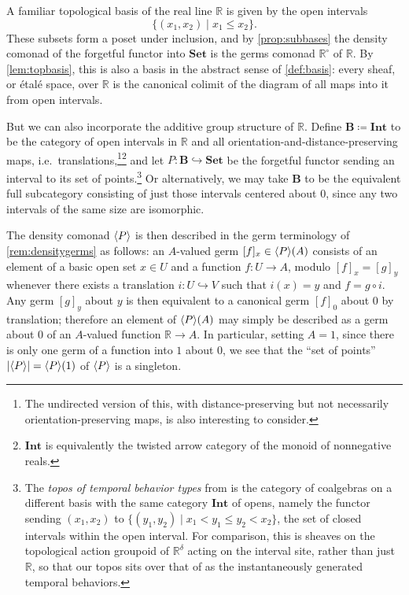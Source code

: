 \documentclass[11pt, oneside, article]{memoir}
\theoremstyle{plain}
\theoremstyle{definition}
\theoremstyle{remark}
\newenvironment{example}
{\renewcommand\qedsymbol{$\lrcorner$}%
  \pushQED{\qed}\myexample}
{\popQED\endmyexample}
\DeclarePairedDelimiter{\gen}{\langle}{\rangle}
\DeclarePairedDelimiter{\abs}{\lvert}{\rvert}
\newcommand{\namedcat}[1]{\mathbf{#1}}
\newcommand{\cat}[1]{\mathbf{#1}}
\newcommand{\Set}{\namedcat{Set}}
\newcommand{\Int}{\namedcat{Int}}
\newcommand{\pts}[1]{{\abs{#1}}}
\newcommand{\ph}[1]{#1}
\newcommand{\setof}[1]{\{#1\}}
\newcommand{\xA}{A}
\newcommand{\bB}{\cat{B}}
\newcommand{\pP}{\ph{P}}
\newcommand{\cP}{\gen{\pP}}
\newcommand{\toptocmd}[1]{{{#1}^\circ}}
\newcommand{\rr}{\mathbb{R}}
\begin{document}
\begin{example}[Infinitesimal group actions]\label{ex:real_line}\label{ex:etendue}\label{ex:topgroup}
  A familiar topological basis of the real line $\rr$ is given by the open
  intervals
  \[
    \setof{(x_1,x_2)\mid x_1 \leq x_2}.
  \]
  These subsets form a poset under inclusion, and by
  \cref{prop:subbases} the density comonad of the forgetful functor
  into $\Set$ is the germs comonad $\toptocmd{\rr}$ of $\rr$. By
  \cref{lem:topbasis}, this is also a basis in the abstract sense of
  \cref{def:basis}: every sheaf, or \'etal\'e space, over $\rr$ is the
  canonical colimit of the diagram of all maps into it from open
  intervals.

  But we can also incorporate the additive group structure of
  $\rr$. Define $\bB \coloneqq \Int$ to be the category of open
  intervals in $\rr$ and all orientation-and-distance-preserving maps,
  i.e.\ translations,\footnote{The undirected version of this, with
    distance-preserving but not necessarily orientation-preserving
    maps, is also interesting to consider.}\footnote{$\Int$ is
    equivalently the twisted arrow category of the monoid of
    nonnegative reals.} and let $\pP \colon \bB \hookrightarrow \Set$
  be the forgetful functor sending an interval to its set of
  points.\footnote{The \emph{topos of temporal behavior types} from
    \cite{schultz-spivak} is the category of coalgebras on a different
    basis with the same category $\Int$ of opens, namely the functor
    sending $(x_1,x_2)$ to
    $\setof{(y_1,y_2)\mid x_1<y_1\leq y_2<x_2}$, the set of closed
    intervals within the open interval. For comparison, this is 
    sheaves on the topological action groupoid of $\mathbb{R}^\delta$ 
    acting on the interval site, rather than just $\mathbb{R}$, so 
    that our topos sits over that of \cite{schultz-spivak} as the instantaneously
    generated temporal behaviors.}  Or alternatively, we may
  take $\bB$ to be the equivalent full subcategory consisting of just
  those intervals centered about $0$, since any two intervals of the
  same size are isomorphic.

  The density comonad $\cP$ is then described in the germ terminology
  of \cref{rem:densitygerms} as follows: an $\xA$-valued germ
  $[f]_x \in \cP(\xA)$ consists of an element of a basic open set
  $x \in U$ and a function $f \colon U \to \xA$, modulo
  $[f]_x = [g]_y$ whenever there exists a translation
  $i \colon U \hookrightarrow V$ such that $i(x) = y$ and
  $f = g \circ i$. Any germ $[g]_y$ about $y$ is then equivalent to a
  canonical germ $[f]_0$ about $0$ by translation; therefore an element of
  $\cP(\xA)$ may simply be described as a germ about $0$ of an
  $\xA$-valued function $\rr \to \xA$. In particular, setting $\xA=1$,
  since there is only one germ of a function into $1$ about $0$, we see
  that the ``set of points'' $\pts{\cP}=\cP(1)$ of $\cP$ is a singleton.


\end{example}
\end{document}
